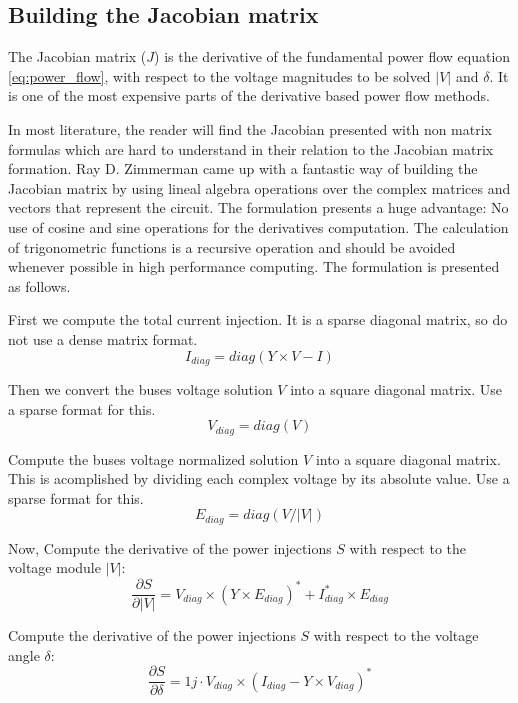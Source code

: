 \documentclass[a4paper,twoside,fleqn]{tufte-book}
\begin{document}
\subsection{Building the Jacobian matrix} \label{Jacobian_chapter}

The Jacobian matrix ($J$) is the derivative of the fundamental power flow equation \ref{eq:power_flow}, with respect to the voltage magnitudes to be solved $|V|$ and $\delta$. It is one of the most expensive parts of the derivative based power flow methods.

In most literature, the reader will find the Jacobian presented with non matrix formulas which are hard to understand in their relation to the Jacobian matrix formation. Ray D. Zimmerman came up with a fantastic way of building the Jacobian matrix \cite{zimmerman2010ac} by using lineal algebra operations over the complex matrices and vectors that represent the circuit. The formulation presents a huge advantage: No use of cosine and sine operations for the derivatives computation. The calculation of trigonometric functions is a recursive operation and should be avoided whenever possible in high performance computing. The formulation is presented as follows.

First we compute the total current injection. It is a sparse diagonal matrix, so do not use a dense matrix format.
\begin{equation}
I_{diag} = diag(Y \times V - I)
\end{equation}

Then we convert the buses voltage solution $V$ into a square diagonal matrix. Use a sparse format for this.
\begin{equation}
V_{diag} = diag(V)
\end{equation}

Compute the buses voltage normalized solution $V$ into a square diagonal matrix. This is acomplished by dividing each complex voltage by its absolute value. Use a sparse format for this.
\begin{equation}
E_{diag} = diag(V / |V|)
\end{equation}

Now, Compute the derivative of the power injections $S$ with respect to the voltage module $|V|$:
\begin{equation}
\frac{\partial S}{\partial |V|} = V_{diag} \times (Y \times E_{diag})^* + I_{diag}^* \times  E_{diag}
\end{equation}
    
Compute the derivative of the power injections $S$ with respect to the voltage angle $\delta$:
\begin{equation}
\frac{\partial S}{\partial \delta} = 1j \cdot V_{diag} \times (I_{diag} - Y \times V_{diag})^*
\end{equation}
\end{document}

